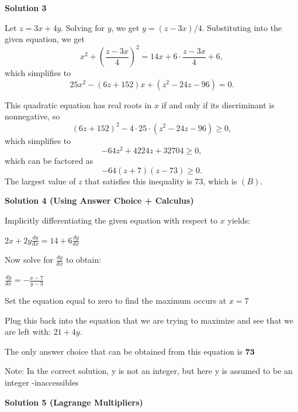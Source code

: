 \begin{enumerate}
 



\textbf{Solution 3}

Let $z = 3x + 4y$. Solving for $y$, we get $y = (z - 3x)/4$. Substituting into the given equation, we get
 \[x^2 + \left( \frac{z - 3x}{4} \right)^2 = 14x + 6 \cdot \frac{z - 3x}{4} + 6,\]which simplifies to
 \[25x^2 - (6z + 152)x + (z^2 - 24z - 96) = 0.\]

 This quadratic equation has real roots in $x$ if and only if its discriminant is nonnegative, so
 \[(6z + 152)^2 - 4 \cdot 25 \cdot (z^2 - 24z - 96) \ge 0,\]which simplifies to
 \[-64z^2 + 4224z + 32704 \ge 0,\]which can be factored as
 \[-64(z + 7)(z - 73) \ge 0.\]The largest value of $z$ that satisfies this inequality is $\boxed{73}$, which is $\boxed{(B)}$.

 


 



\textbf{Solution 4 (Using Answer Choice + Calculus)}

Implicitly differentiating the given equation with respect to $x$ yields:

 $2x + 2y\frac{dy}{dx} = 14 + 6\frac{dy}{dx}$

 Now solve for $\frac{dy}{dx}$ to obtain:

 $\frac{dy}{dx} = -\frac{x - 7}{y - 3}$

 Set the equation equal to zero to find the maximum occurs at $x = 7$

 Plug this back into the equation that we are trying to maximize and see that we are left with: $21 + 4y$.

 The only answer choice that can be obtained from this equation is $\textbf{73}$

 Note: In the correct solution, y is not an integer, but here y is assumed to be an integer -inaccessibles

 



\textbf{Solution 5 (Lagrange Multipliers)}


\end{enumerate}
